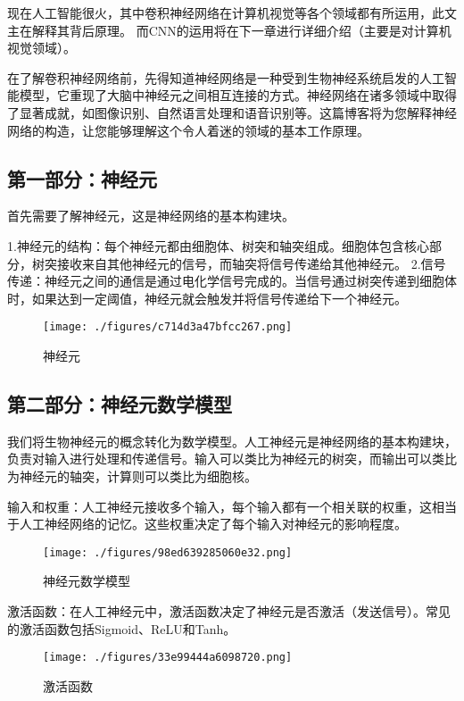 现在人工智能很火，其中卷积神经网络在计算机视觉等各个领域都有所运用，此文主在解释其背后原理。
而CNN的运用将在下一章进行详细介绍（主要是对计算机视觉领域）。

在了解卷积神经网络前，先得知道神经网络是一种受到生物神经系统启发的人工智能模型，它重现了大脑中神经元之间相互连接的方式。神经网络在诸多领域中取得了显著成就，如图像识别、自然语言处理和语音识别等。这篇博客将为您解释神经网络的构造，让您能够理解这个令人着迷的领域的基本工作原理。
\subsection{第一部分：神经元 }
首先需要了解神经元，这是神经网络的基本构建块。

1.神经元的结构：每个神经元都由细胞体、树突和轴突组成。细胞体包含核心部分，树突接收来自其他神经元的信号，而轴突将信号传递给其他神经元。
2.信号传递：神经元之间的通信是通过电化学信号完成的。当信号通过树突传递到细胞体时，如果达到一定阈值，神经元就会触发并将信号传递给下一个神经元。
\begin{figure}[ht]
\centering
\texttt{[image: ./figures/c714d3a47bfcc267.png]}
\caption{神经元} \label{fig_CNN1_1}
\end{figure}

\subsection{第二部分：神经元数学模型 }
我们将生物神经元的概念转化为数学模型。人工神经元是神经网络的基本构建块，负责对输入进行处理和传递信号。输入可以类比为神经元的树突，而输出可以类比为神经元的轴突，计算则可以类比为细胞核。

输入和权重：人工神经元接收多个输入，每个输入都有一个相关联的权重，这相当于人工神经网络的记忆。这些权重决定了每个输入对神经元的影响程度。\begin{figure}[ht]
\centering
\texttt{[image: ./figures/98ed639285060e32.png]}
\caption{神经元数学模型} \label{fig_CNN1_2}
\end{figure}
激活函数：在人工神经元中，激活函数决定了神经元是否激活（发送信号）。常见的激活函数包括Sigmoid、ReLU和Tanh。
\begin{figure}[ht]
\centering
\texttt{[image: ./figures/33e99444a6098720.png]}
\caption{激活函数} \label{fig_CNN1_3}
\end{figure}

